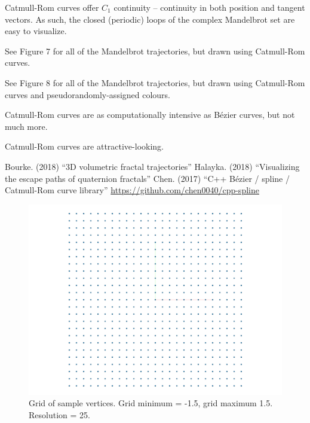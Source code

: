 \documentclass[12pt]{article}
\begin{document}
Catmull-Rom curves offer $C_1$ continuity -- continuity in both position and tangent vectors.
As such, the closed (periodic) loops of the complex Mandelbrot set are easy to visualize.

See Figure 7 for all of the Mandelbrot trajectories, but drawn using Catmull-Rom curves.

See Figure 8 for all of the Mandelbrot trajectories, but drawn using Catmull-Rom curves and pseudorandomly-assigned colours.

Catmull-Rom curves are as computationally intensive as B\'ezier curves, but not much more.

Catmull-Rom curves are attractive-looking.












\begin{thebibliography}{9}
 Bourke. (2018) ``3D volumetric fractal trajectories''
 Halayka. (2018) ``Visualizing the escape paths of quaternion fractals''
 Chen. (2017) ``C++ B\'ezier / spline / Catmull-Rom curve library'' \linebreak \url{https://github.com/chen0040/cpp-spline}

\end{thebibliography}



\pagebreak

\begin{figure} 
\centering
  \includegraphics[width = 5 in]{grid.png}	
  \caption{Grid of sample vertices.
Grid minimum = -1.5, grid maximum 1.5.
Resolution = 25.
}
\end{figure}
\end{document}
